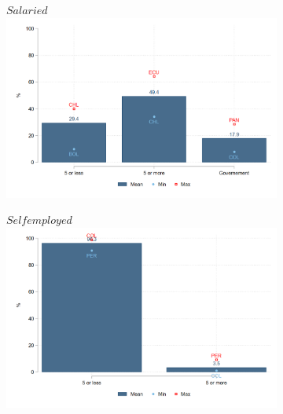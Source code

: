 \documentclass[english]{article}
\begin{document}
\begin{itemize}
\begin{figure}[htb!]
\begin{subfigure}{.5\textwidth}
  \centering
    \footnotesize{$Salaried$}
  \includegraphics[width=1\textwidth]{latex/figures/Snapshot/Salaried-firmsize.png}
  \label{fig:salariedfirmsize}
\end{subfigure}%
\begin{subfigure}{.5\textwidth}
  \centering
    \footnotesize{$Self employed$}
\includegraphics[width=1\textwidth]{latex/figures/Snapshot/Self employed-firmsize.png}
  \label{fig:selfirmsize}
\end{subfigure}


\end{figure}
\end{itemize}
\end{document}
